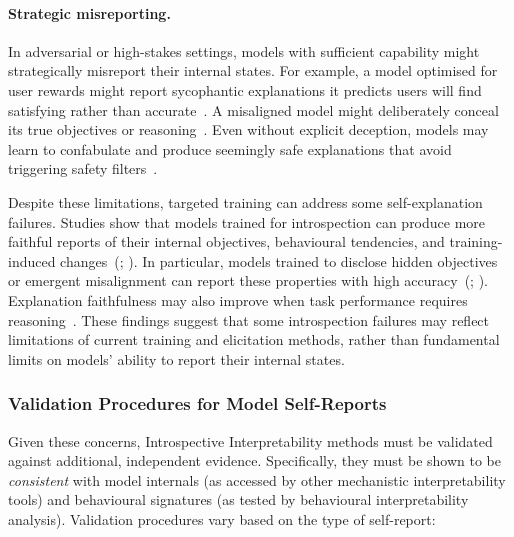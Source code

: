 \begin{warningbox}
\paragraph{Strategic misreporting.} In adversarial or high-stakes settings, models with sufficient capability might strategically misreport their internal states. For example, a model optimised for user rewards might report sycophantic explanations it predicts users will find satisfying rather than accurate~. A misaligned model might deliberately conceal its true objectives or reasoning~. Even without explicit deception, models may learn to confabulate and produce seemingly safe explanations that avoid triggering safety filters~.
\end{warningbox}


Despite these limitations, targeted training can address some self-explanation failures. Studies show that models trained for introspection can produce more faithful reports of their internal objectives, behavioural tendencies, and training-induced changes~(; ). In particular, models trained to disclose hidden objectives or emergent misalignment can report these properties with high accuracy~(; ). Explanation faithfulness may also improve when task performance requires reasoning~. These findings suggest that some introspection failures may reflect limitations of current training and elicitation methods, rather than fundamental limits on models' ability to report their internal states.


\subsubsection{Validation Procedures for Model Self-Reports}
\label{subsec:valproce model self-reports}

Given these concerns, Introspective Interpretability methods must be validated against additional, independent evidence. Specifically, they must be shown to be \emph{consistent} with model internals (as accessed by other mechanistic interpretability tools) and behavioural signatures (as tested by behavioural interpretability analysis). Validation procedures vary based on the type of self-report:


